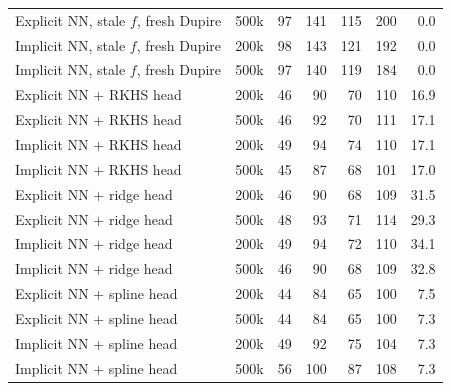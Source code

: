 \begin{tabular}{l l rr rr r}
Explicit NN, stale $f$, fresh Dupire & 500k & 97 & 141 & 115 & 200 & 0.0\\
Implicit NN, stale $f$, fresh Dupire & 200k & 98 & 143 & 121 & 192 & 0.0\\
Implicit NN, stale $f$, fresh Dupire & 500k & 97 & 140 & 119 & 184 & 0.0\\
Explicit NN + RKHS head & 200k & 46 & 90 & 70 & 110 & 16.9\\
Explicit NN + RKHS head & 500k & 46 & 92 & 70 & 111 & 17.1\\
Implicit NN + RKHS head & 200k & 49 & 94 & 74 & 110 & 17.1\\
Implicit NN + RKHS head & 500k & 45 & 87 & 68 & 101 & 17.0\\
Explicit NN + ridge head & 200k & 46 & 90 & 68 & 109 & 31.5\\
Explicit NN + ridge head & 500k & 48 & 93 & 71 & 114 & 29.3\\
Implicit NN + ridge head & 200k & 49 & 94 & 72 & 110 & 34.1\\
Implicit NN + ridge head & 500k & 46 & 90 & 68 & 109 & 32.8\\
Explicit NN + spline head & 200k & 44 & 84 & 65 & 100 & 7.5\\
Explicit NN + spline head & 500k & 44 & 84 & 65 & 100 & 7.3\\
Implicit NN + spline head & 200k & 49 & 92 & 75 & 104 & 7.3\\
Implicit NN + spline head & 500k & 56 & 100 & 87 & 108 & 7.3\\
\bottomrule
\end{tabular}
